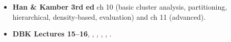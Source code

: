 \begin{itemize}
  \item \textbf{Han \& Kamber 3rd ed} ch 10 (basic cluster analysis, partitioning, hierarchical,
        density-based, evaluation) and ch 11 (advanced). 
  \item \textbf{DBK Lectures 15--16}, ,
        , , ,
        .
\end{itemize}
